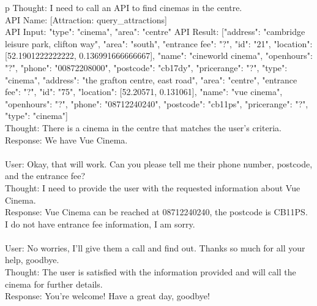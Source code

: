 \begin{table*}
\begin{tabular}{p\linewidth}
Thought: I need to call an API to find cinemas in the centre. \\
API Name: [Attraction: query\_attractions] \\
API Input: {"type": "cinema", "area": "centre"}
API Result: [{"address": "cambridge leisure park, clifton way", "area": "south", "entrance fee": "?", "id": "21", "location": [52.1901222222222, 0.136991666666667], "name": "cineworld cinema", "openhours": "?", "phone": "00872208000", "postcode": "cb17dy", "pricerange": "?", "type": "cinema"}, {"address": "the grafton centre, east road", "area": "centre", "entrance fee": "?", "id": "75", "location": [52.20571, 0.131061], "name": "vue cinema", "openhours": "?", "phone": "08712240240", "postcode": "cb11ps", "pricerange": "?", "type": "cinema"}] \\
Thought: There is a cinema in the centre that matches the user's criteria. \\
Response: We have Vue Cinema. \\
 \\
User: Okay, that will work. Can you please tell me their phone number, postcode, and the entrance fee? \\
Thought: I need to provide the user with the requested information about Vue Cinema. \\
Response: Vue Cinema can be reached at 08712240240, the postcode is CB11PS. I do not have entrance fee information, I am sorry. \\
 \\
User: No worries, I'll give them a call and find out. Thanks so much for all your help, goodbye. \\
Thought: The user is satisfied with the information provided and will call the cinema for further details. \\
Response: You're welcome! Have a great day, goodbye! \\
 \\
\bottomrule \\
\end{tabular}
\end{table*}